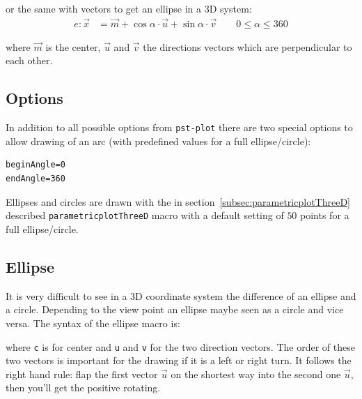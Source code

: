 \documentclass[11pt,english,bibliography=totoc,parskip=false,headings=small,
    headinclude=false,footinclude=false,twoside,english,usegeometry]{pst-doc}
\begin{document}
or the same with vectors to get an ellipse in a 3D system:
\begin{align}\label{gl.6}
	e:\vec{x} &=\vec{m}+\cos\alpha\cdot\vec{u}+\sin\alpha\cdot\vec{v}\qquad 0\leq\alpha\leq360	
\end{align}

where $\vec{m}$ is the center,  $\vec{u}$ and $\vec{v}$ the directions vectors which are 
perpendicular to each other. 


\subsection{Options}
In addition to all possible options from \verb|pst-plot| there are two special 
options to allow drawing of an arc (with predefined values for a full ellipse/circle):
%
\begin{verbatim}
beginAngle=0
endAngle=360
\end{verbatim}

Ellipses and circles are drawn with the in section~\ref{subsec:parametricplotThreeD} described 
\verb|parametricplotThreeD| macro with a default setting of $50$ points for a full ellipse/circle.

\subsection{Ellipse}
It is very difficult to see in a 3D coordinate system the difference of an ellipse and a circle. Depending to the view point an ellipse maybe seen as a circle and vice versa. The syntax of the ellipse macro is:
\begin{BDef}
\OptArgs{}
\end{BDef}

where \verb|c| is for center and \verb|u| and \verb|v| for the two direction vectors. 
The order of these two vectors is important for the drawing if it
is a left or right turn. It follows the right hand rule: flap the first vector $\vec{u}$ on the 
shortest way into the second one  $\vec{u}$, then you'll get the positive rotating.
\end{document}
